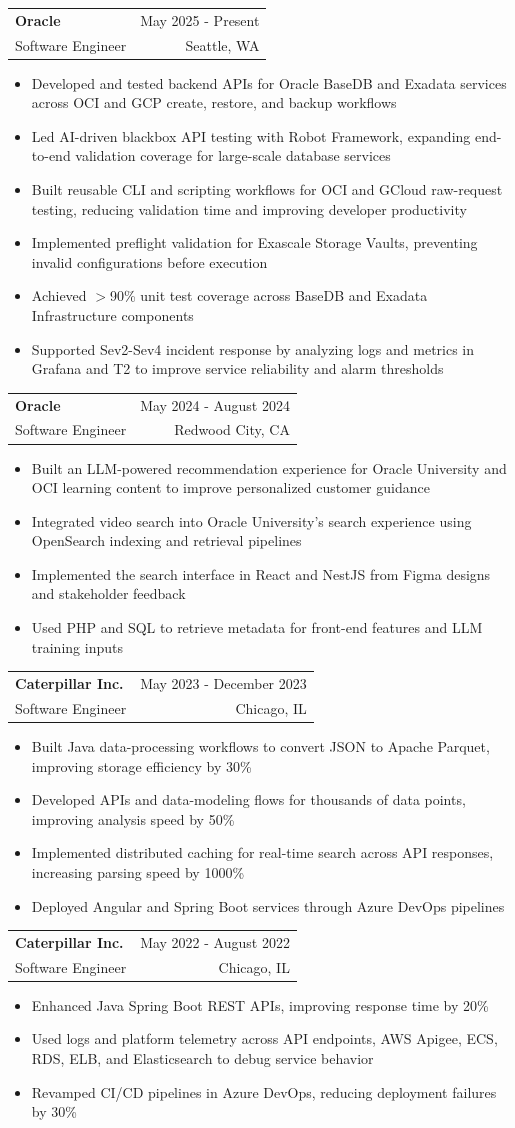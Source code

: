 \documentclass[letterpaper,11pt]{article}
\makeatletter
\newcommand{\resumeItem}[1]{
  \item\small{
    {#1 \vspace{-2pt}}
  }
}
\newcommand{\resumeSubheading}[4]{
  \vspace{-2pt}\item
    \begin{tabular*}{0.97\textwidth}[t]{l@{\extracolsep{\fill}}r}
      \textbf{#1} & #2 \\
      {\small#3} & {\small #4} \\
    \end{tabular*}\vspace{-7pt}
}
\newcommand{\resumeItemListStart}{\begin{itemize}}
\newcommand{\resumeItemListEnd}{\end{itemize}\vspace{-5pt}}
\makeatother
\begin{document}
    \resumeSubheading
  {Oracle}{May 2025 - Present}
  {Software Engineer}{Seattle, WA}
  \resumeItemListStart
    \resumeItem{Developed and tested backend APIs for Oracle BaseDB and Exadata services across OCI and GCP create, restore, and backup workflows}
    \resumeItem{Led AI-driven blackbox API testing with Robot Framework, expanding end-to-end validation coverage for large-scale database services}
    \resumeItem{Built reusable CLI and scripting workflows for OCI and GCloud raw-request testing, reducing validation time and improving developer productivity}
    \resumeItem{Implemented preflight validation for Exascale Storage Vaults, preventing invalid configurations before execution}
    \resumeItem{Achieved $>$90\% unit test coverage across BaseDB and Exadata Infrastructure components}
    \resumeItem{Supported Sev2-Sev4 incident response by analyzing logs and metrics in Grafana and T2 to improve service reliability and alarm thresholds}
  \resumeItemListEnd

    \resumeSubheading
      {Oracle}{May 2024 - August 2024}
      {Software Engineer}{Redwood City, CA}
      \resumeItemListStart
        \resumeItem{Built an LLM-powered recommendation experience for Oracle University and OCI learning content to improve personalized customer guidance}
        \resumeItem{Integrated video search into Oracle University's search experience using OpenSearch indexing and retrieval pipelines}
        \resumeItem{Implemented the search interface in React and NestJS from Figma designs and stakeholder feedback}
        \resumeItem{Used PHP and SQL to retrieve metadata for front-end features and LLM training inputs}
      \resumeItemListEnd

    \resumeSubheading
      {Caterpillar Inc.}{May 2023 - December 2023}
      {Software Engineer}{Chicago, IL}
      \resumeItemListStart
        \resumeItem{Built Java data-processing workflows to convert JSON to Apache Parquet, improving storage efficiency by 30\%}
        \resumeItem{Developed APIs and data-modeling flows for thousands of data points, improving analysis speed by 50\%}
        \resumeItem{Implemented distributed caching for real-time search across API responses, increasing parsing speed by 1000\%}
        \resumeItem{Deployed Angular and Spring Boot services through Azure DevOps pipelines}
      \resumeItemListEnd

    \resumeSubheading
      {Caterpillar Inc.}{May 2022 - August 2022}
      {Software Engineer}{Chicago, IL}
      \resumeItemListStart
        \resumeItem{Enhanced Java Spring Boot REST APIs, improving response time by 20\%}
        \resumeItem{Used logs and platform telemetry across API endpoints, AWS Apigee, ECS, RDS, ELB, and Elasticsearch to debug service behavior}
        \resumeItem{Revamped CI/CD pipelines in Azure DevOps, reducing deployment failures by 30\%}
    \resumeItemListEnd
\end{document}
